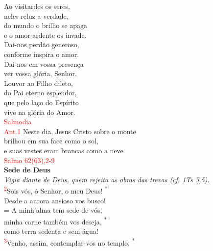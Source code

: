 \documentclass{book}
\begin{document}
\begin{center}
    Ao visitardes os seres, \\
    neles reluz a verdade, \\
    do mundo o brilho se apaga \\
    e o amor ardente os invade.
    \vspace{.2cm} \\
    Dai-nos perdão generoso, \\
    conforme inspira o amor. \\
    Dai-nos em vossa presença \\
    ver vossa glória, Senhor.
    \vspace{.2cm} \\
    Louvor ao Filho dileto, \\
    do Pai eterno esplendor, \\
    que pelo laço do Espírito \\
    vive na glória do Amor.
    \vspace{.2cm} \\
    \textcolor{red}{Salmodia}
    \vspace{.2cm} \\
    \textcolor{red}{Ant.1} Neste dia, Jesus Cristo sobre o monte \\
    brilhou em sua face como o sol, \\
    e suas vestes eram brancas como a neve.
    \vspace{.2cm} \\
    \textcolor{red}{Salmo 62(63),2-9}
    \vspace{.2cm} \\
    \textbf{Sede de Deus} \\
    \textit{Vigia diante de Deus, quem rejeita as obras das trevas (cf. 1Ts 5,5).}
    \vspace{.2cm} \\
    \textsuperscript{\underline{\hspace{.06in}}\textcolor{red}{2}}Sois vós, ó Senhor, o meu Deus! \textsuperscript{*} \\
    Desde a aurora ansioso vos busco! \\
    = A minh'alma tem sede de vós, \dag{} \\
    minha carne também vos deseja, \textsuperscript{*} \\
    como terra sedenta e sem água!
    \vspace{.2cm} \\
    \textsuperscript{\underline{\hspace{.06in}}\textcolor{red}{3}}Venho, assim, contemplar-vos no templo, \textsuperscript{*} \\

\end{center}
\end{document}
